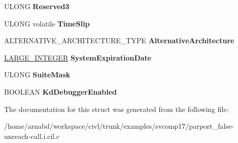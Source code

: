 \begin{DoxyCompactItemize}
\item 
\hypertarget{struct__KUSER__SHARED__DATA_ad67a02f1eeb2603704aa9a928e776d8d}{}U\+L\+O\+N\+G {\bfseries Reserved3}\label{struct__KUSER__SHARED__DATA_ad67a02f1eeb2603704aa9a928e776d8d}

\item 
\hypertarget{struct__KUSER__SHARED__DATA_a43fcc3166722df566735ac9f0c1df7d1}{}U\+L\+O\+N\+G volatile {\bfseries Time\+Slip}\label{struct__KUSER__SHARED__DATA_a43fcc3166722df566735ac9f0c1df7d1}

\item 
\hypertarget{struct__KUSER__SHARED__DATA_ad78780eac1ac3b03029e25c19fc46a02}{}A\+L\+T\+E\+R\+N\+A\+T\+I\+V\+E\+\_\+\+A\+R\+C\+H\+I\+T\+E\+C\+T\+U\+R\+E\+\_\+\+T\+Y\+P\+E {\bfseries Alternative\+Architecture}\label{struct__KUSER__SHARED__DATA_ad78780eac1ac3b03029e25c19fc46a02}

\item 
\hypertarget{struct__KUSER__SHARED__DATA_a9f16cb03e6ab44fdc4a5db8b7b4e8bff}{}\hyperlink{union__LARGE__INTEGER}{L\+A\+R\+G\+E\+\_\+\+I\+N\+T\+E\+G\+E\+R} {\bfseries System\+Expiration\+Date}\label{struct__KUSER__SHARED__DATA_a9f16cb03e6ab44fdc4a5db8b7b4e8bff}

\item 
\hypertarget{struct__KUSER__SHARED__DATA_ab6531de6b6adbea2d803bb0df727ccc8}{}U\+L\+O\+N\+G {\bfseries Suite\+Mask}\label{struct__KUSER__SHARED__DATA_ab6531de6b6adbea2d803bb0df727ccc8}

\item 
\hypertarget{struct__KUSER__SHARED__DATA_a562982b357f7bba7bad1719669de939f}{}B\+O\+O\+L\+E\+A\+N {\bfseries Kd\+Debugger\+Enabled}\label{struct__KUSER__SHARED__DATA_a562982b357f7bba7bad1719669de939f}

\end{DoxyCompactItemize}


The documentation for this struct was generated from the following file\+:\begin{DoxyCompactItemize}
\item 
/home/arnabd/workspace/civl/trunk/examples/svcomp17/parport\+\_\+false-\/unreach-\/call.\+i.\+cil.\+c\end{DoxyCompactItemize}
